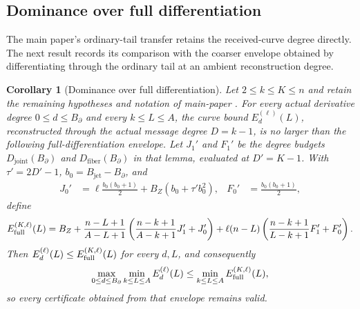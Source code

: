 \documentclass[11pt,letterpaper]{article}
\newtheorem{corollary}[corollary]{Corollary}
\theoremstyle{definition}
\newcommand{\Bpartial}{B_{\partial}}
\newcommand{\Bjet}{B_{\mathrm{jet}}}
\newcommand{\BZ}{B_Z}
\begin{document}
\subsection{Dominance over full differentiation}

The main paper's ordinary-tail transfer retains the received-curve degree
directly. The next result records its comparison with the coarser envelope
obtained by differentiating through the ordinary tail at an ambient
reconstruction degree.

\begin{corollary}[Dominance over full differentiation]
\label{lem:capped-first-order-transfer}
Let $2\le k\le K\le n$ and retain the remaining hypotheses and notation of
main-paper . For every actual derivative
degree $0\le d\le\Bpartial$ and every $k\le L\le A$, the curve bound
$E_d^{(\ell)}(L)$, reconstructed through the actual message degree
$D=k-1$, is no larger than the following full-differentiation envelope.
Let $J_1'$ and $F_1'$ be the degree budgets
$D_{\mathrm{joint}}(\Bpartial)$ and
$D_{\mathrm{fiber}}(\Bpartial)$ in that lemma, evaluated at $D'=K-1$.
With $\tau'=2D'-1$, $b_0=\Bjet-\Bpartial$, and
\begin{align*}
 J_0'&=\ell\frac{b_0(b_0+1)}2
       +\BZ(b_0+\tau'b_0^2),&
 F_0'&=\frac{b_0(b_0+1)}2,
\end{align*}
define
\[
 E_{\rm full}^{(K,\ell)}(L)=\BZ
 +\frac{n-L+1}{A-L+1}
       \left(\frac{n-k+1}{A-k+1}J_1'+J_0'\right)
 +\ell(n-L)\left(\frac{n-k+1}{L-k+1}F_1'+F_0'\right).
\]
Then $E_d^{(\ell)}(L)\le E_{\rm full}^{(K,\ell)}(L)$ for every
$d,L$, and consequently
\begin{equation}
 \max_{0\le d\le\Bpartial}\min_{k\le L\le A}E_d^{(\ell)}(L)
 \le \min_{k\le L\le A}E_{\rm full}^{(K,\ell)}(L),
 \label{eq:capped-first-order-transfer}
\end{equation}
so every certificate obtained from that envelope remains valid.
\end{corollary}
\end{document}
